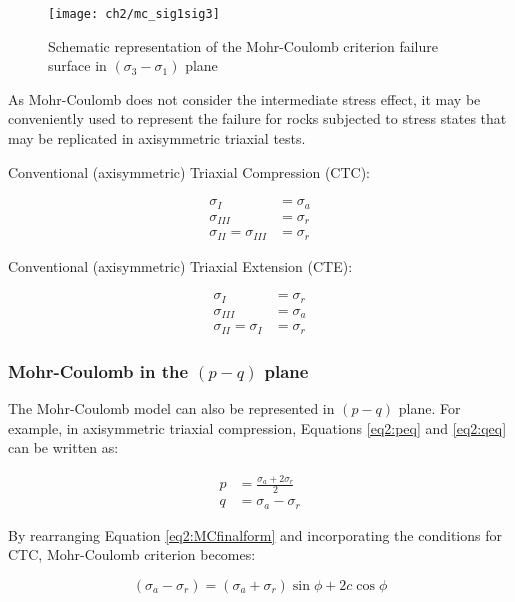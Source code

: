 \begin{figure}[tb]
    \centering
    \texttt{[image: ch2/mc\_sig1sig3]}
    \caption{Schematic representation of the Mohr-Coulomb criterion failure surface in $(\sigma_3 -\sigma_1)$ plane}
    \label{fig2:mc_sig1sig3}
\end{figure}

As Mohr-Coulomb does not consider the intermediate stress effect, it may be conveniently used to represent the failure for rocks subjected to stress states that may be replicated in axisymmetric triaxial tests.

Conventional (axisymmetric) Triaxial Compression (CTC): 

\begin{align}
    \sigma_I &= \sigma_a \\
    \sigma_{III} &= \sigma_r\\
    \sigma_{II} = \sigma_{III} &= \sigma_r
\end{align}

Conventional (axisymmetric) Triaxial Extension (CTE):

\begin{align}
    \sigma_I &= \sigma_r \\
    \sigma_{III} &= \sigma_a\\
    \sigma_{II} = \sigma_{I} &= \sigma_r
\end{align}

\subsubsection{Mohr-Coulomb in the \texorpdfstring{$(p - q)$}{p - q} plane} \label{ch2:MC-pq}

The Mohr-Coulomb model can also be represented in $(p-q)$ plane. For example, in axisymmetric triaxial compression, Equations \ref{eq2:peq} and \ref{eq2:qeq} can be written as: 

\begin{align}
    p &= \frac{\sigma_a+2\sigma_r}{2} \label{eq2:p2} \\
    q &= \sigma_a - \sigma_r \label{eq2:q2}
\end{align}

By rearranging Equation \ref{eq2:MCfinalform} and incorporating the conditions for CTC, Mohr-Coulomb criterion becomes:

\begin{equation}\label{eq2:MCcrit}
    \left(\sigma_a - \sigma_r\right) = \left(\sigma_a+\sigma_r\right)\sin \phi + 2 c\cos \phi
\end{equation}

